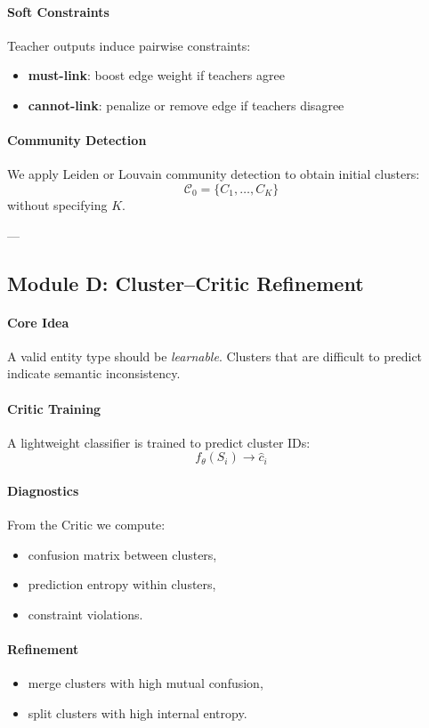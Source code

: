 \documentclass[14pt]{extreport}
\begin{document}
\paragraph{Soft Constraints}
Teacher outputs induce pairwise constraints:
\begin{itemize}
    \item \textbf{must-link}: boost edge weight if teachers agree
    \item \textbf{cannot-link}: penalize or remove edge if teachers disagree
\end{itemize}

\paragraph{Community Detection}
We apply Leiden or Louvain community detection to obtain initial clusters:
\[
\mathcal{C}_0 = \{C_1,\dots,C_K\}
\]
without specifying $K$.

---

\subsection{Module D: Cluster--Critic Refinement}

\paragraph{Core Idea}
A valid entity type should be \emph{learnable}.
Clusters that are difficult to predict indicate semantic inconsistency.

\paragraph{Critic Training}
A lightweight classifier is trained to predict cluster IDs:
\[
f_\theta(S_i) \rightarrow \hat{c}_i
\]

\paragraph{Diagnostics}
From the Critic we compute:
\begin{itemize}
    \item confusion matrix between clusters,
    \item prediction entropy within clusters,
    \item constraint violations.
\end{itemize}

\paragraph{Refinement}
\begin{itemize}
    \item merge clusters with high mutual confusion,
    \item split clusters with high internal entropy.
\end{itemize}
\end{document}
